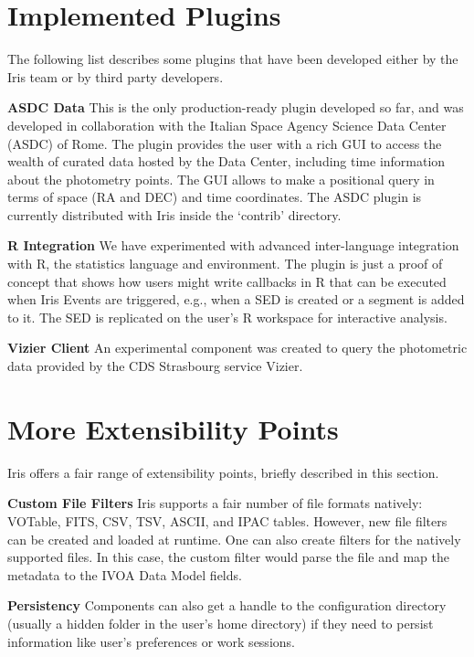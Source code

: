\section{Implemented Plugins}
The following list describes some plugins that have been developed either by the Iris team or by third party developers.

\textbf{ASDC Data}
This is the only production-ready plugin developed so far, and was developed in collaboration with the Italian Space Agency Science Data Center (ASDC) of Rome. The plugin provides the user with a rich GUI to access the wealth of curated data hosted by the Data Center, including time information about the photometry points. The GUI allows to make a positional query in terms of space (RA and DEC) and time coordinates.
The ASDC plugin is currently distributed with Iris inside the `contrib' directory.

\textbf{R Integration}
We have experimented with advanced inter-language integration with R, the statistics language and environment. The plugin is just a proof of concept that shows how users might write callbacks in R that can be executed when Iris Events are triggered, e.g., when a SED is created or a segment is added to it. The SED is replicated on the user's R workspace for interactive analysis.

\textbf{Vizier Client}
An experimental component was created to query the photometric data provided by the CDS Strasbourg service Vizier.

\section{More Extensibility Points}
Iris offers a fair range of extensibility points, briefly described in this section.

\textbf{Custom File Filters}
Iris supports a fair number of file formats natively: VOTable, FITS, CSV, TSV, ASCII, and IPAC tables. However, new file filters can be created and loaded at runtime. One can also create filters for the natively supported files. In this case, the custom filter would parse the file and map the metadata to the IVOA Data Model fields.

\textbf{Persistency}
Components can also get a handle to the configuration directory (usually a hidden folder in the user's home directory) if they need to persist information like user's preferences or work sessions.

